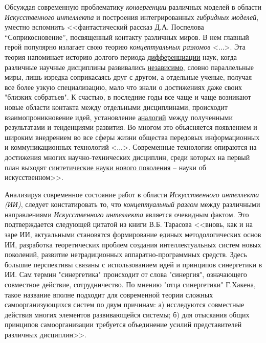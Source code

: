Обсуждая современную проблематику \textit{конвергенции} различных моделей в области \textit{Искусственного интеллекта} и построения интегрированных \textit{гибридных моделей}, уместно вспомнить <<фантастический рассказ Д.А. Поспелова ``Соприкосновение'', посвященный контакту различных миров. В нем главный герой популярно излагает свою теорию \textit{концептуальных разломов} <...>. Эта теория напоминает историю долгого периода \underline{дифференциации} наук, когда различные научные дисциплины развивались \underline{независимо}, словно параллельные миры, лишь изредка соприкасаясь друг с другом, а отдельные ученые, получая все более узкую специализацию, мало что знали о достижениях даже своих "близких собратьев". К счастью, в последние годы все чаще и чаще возникают новые области контакта между отдельными дисциплинами, происходит взаимопроникновение идей, установление \underline{аналогий} между полученными результатами и тенденциями развития. Во многом это объясняется появлением и широким внедрением во все сферы жизни общества передовых информационных и коммуникационных технологий <...>. Современные технологии опираются на достижения многих научно-технических дисциплин, среди которых на первый план выходят \underline{синтетические науки нового поколения} -- науки об искусственном>>.
\begin{SCn}
\end{SCn}

Анализируя современное состояние работ в области \textit{Искусственного интеллекта (ИИ)}, следует констатировать то, что \textit{концептуальный разлом} между различными направлениями \textit{Искусственного интеллекта} является очевидным фактом. Это подтверждается следующей цитатой из книги В.Б. Тарасова  <<вновь, как и на заре ИИ, актуальными становятся формирование единых методологических основ ИИ, разработка теоретических проблем создания интеллектуальных систем новых поколений, развитие нетрадиционных аппаратно-программных средств. Здесь большие перспективы связаны с использованием идей и принципов синергетики в ИИ. Сам термин "синергетика"{} происходит от слова "синергия"{}, означающего совместное действие, сотрудничество. По мнению "отца синергетики"{} Г.Хакена, такое название вполне подходит для современной теории сложных самоорганизующихся систем по двум причинам: а) исследуются совместные действия многих элементов развивающейся системы; б) для отыскания общих принципов самоорганизации требуется объединение усилий представителей различных дисциплин>>.
\begin{SCn}
\end{SCn}

